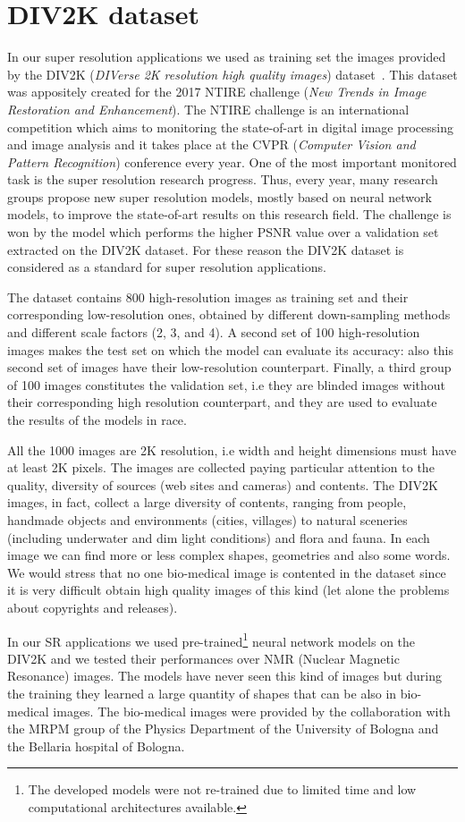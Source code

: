 \documentclass{standalone}
\begin{document}
\section[DIV2K dataset]{DIV2K dataset}\label{SR:div2k}

In our super resolution applications we used as training set the images provided by the DIV2K (\emph{DIVerse 2K resolution high quality images}) dataset~\cite{Agustsson_2017_CVPR_Workshops}.
This dataset was appositely created for the 2017 NTIRE challenge (\emph{New Trends in Image Restoration and Enhancement}).
The NTIRE challenge is an international competition which aims to monitoring the state-of-art in digital image processing and image analysis and it takes place at the CVPR (\emph{Computer Vision and Pattern Recognition}) conference every year.
One of the most important monitored task is the super resolution research progress.
Thus, every year, many research groups propose new super resolution models, mostly based on neural network models, to improve the state-of-art results on this research field.
The challenge is won by the model which performs the higher PSNR value over a validation set extracted on the DIV2K dataset.
For these reason the DIV2K dataset is considered as a standard for super resolution applications.

The dataset contains 800 high-resolution images as training set and their corresponding low-resolution ones, obtained by different down-sampling methods and different scale factors (2, 3, and 4).
A second set of 100 high-resolution images makes the test set on which the model can evaluate its accuracy: also this second set of images have their low-resolution counterpart.
Finally, a third group of 100 images constitutes the validation set, i.e they are blinded images without their corresponding high resolution counterpart, and they are used to evaluate the results of the models in race.

All the 1000 images are 2K resolution, i.e width and height dimensions must have at least 2K pixels.
The images are collected paying particular attention to the quality, diversity of sources (web sites and cameras) and contents.
The DIV2K images, in fact, collect a large diversity of contents, ranging from people, handmade objects and environments (cities, villages) to natural sceneries (including underwater and dim light conditions) and flora and fauna.
In each image we can find more or less complex shapes, geometries and also some words.
We would stress that no one bio-medical image is contented in the dataset since it is very difficult obtain high quality images of this kind (let alone the problems about copyrights and releases).

In our SR applications we used pre-trained\footnote{
  The developed models were not re-trained due to limited time and low computational architectures available.
} neural network models on the DIV2K and we tested their performances over NMR (Nuclear Magnetic Resonance) images.
The models have never seen this kind of images but during the training they learned a large quantity of shapes that can be  also in bio-medical images.
The bio-medical images were provided by the collaboration with the MRPM group of the Physics Department of the University of Bologna and the Bellaria hospital of Bologna.
\end{document}
